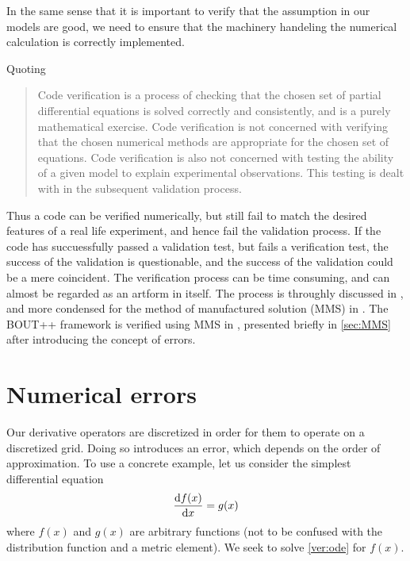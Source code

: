 In the same sense that it is important to verify that the assumption in our models are good, we need to ensure that the machinery handeling the numerical calculation is correctly implemented.

Quoting \cite{Dudson2016}

\blockquote{
Code verification is a process of checking that the chosen set of partial differential equations is solved correctly and consistently, and is a purely mathematical exercise.
Code verification is not concerned with verifying that the chosen numerical methods are appropriate for the chosen set of equations.
Code verification is also not concerned with testing the ability of a given model to explain experimental observations.
This testing is dealt with in the subsequent validation process.
}

Thus a code can be verified numerically, but still fail to match the desired features of a real life experiment, and hence fail the validation process.
If the code has succuessfully passed a validation test, but fails a verification test, the success of the validation is questionable, and the success of the validation could be a mere coincident.
The verification process can be time consuming, and can almost be regarded as an artform in itself.
The process is throughly discussed in \cite{Oberkampf2010book}, and more condensed for the method of manufactured solution (MMS) in \cite{Salari}.
The BOUT++ framework is verified using MMS in \cite{Dudson2016}, presented briefly in \cref{sec:MMS} after introducing the concept of errors.

\section{Numerical errors}
%
Our derivative operators are discretized in order for them to operate on a discretized grid.
Doing so introduces an error, which depends on the order of approximation.
To use a concrete example, let us consider the simplest differential equation
%
\begin{align}
    \frac{\text{d}{f(x)}}{\text{d}{x}} = g(x)
    \label{ver:ode}
\end{align}
%
where $f(x)$ and $g(x)$ are arbitrary functions (not to be confused with the distribution function and a metric element).
We seek to solve \cref{ver:ode} for $f(x)$.

